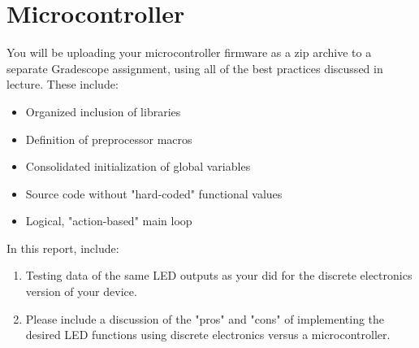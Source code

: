 \documentclass[10pt]{article}
\begin{document}
\section{Microcontroller}
You will be uploading your microcontroller firmware as a zip archive to a
separate Gradescope assignment, using all of the best practices discussed in
lecture.  These include:
\begin{itemize}
    \item Organized inclusion of libraries
    \item Definition of preprocessor macros
    \item Consolidated initialization of global variables
    \item Source code without "hard-coded" functional values
    \item Logical, "action-based" main loop
\end{itemize}

In this report, include:
\begin{enumerate}
    \item Testing data of the same LED outputs as your did for the discrete
    electronics version of your device.
    \item Please include a discussion of the "pros" and "cons" of implementing
    the desired LED functions using discrete electronics versus a
    microcontroller.
\end{enumerate} 
\end{document}
